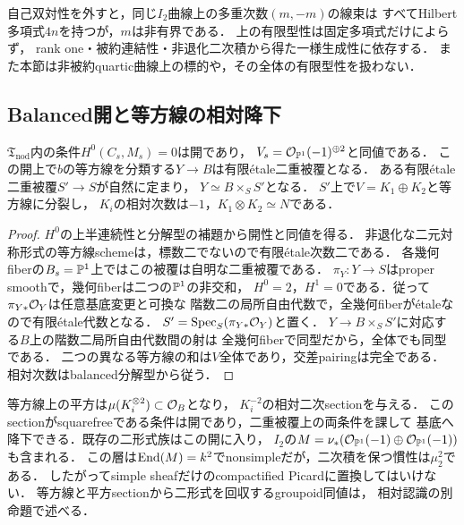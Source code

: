 \begin{remark}[固定Hilbert多項式だけでは足りない]
自己双対性を外すと，同じ$I_2$曲線上の多重次数$(m,-m)$の線束は
すべてHilbert多項式$4n$を持つが，$m$は非有界である．
上の有限型性は固定多項式だけによらず，
rank one・被約連結性・非退化二次積から得た一様生成性に依存する．
また本節は非被約quartic曲線上の標的や，その全体の有限型性を扱わない．
\end{remark}

\subsection{Balanced開と等方線の相対降下}

\begin{lemma}[balanced開と基底上の等方線二重被覆]
\label{lem:qa-tf-balanced-isotropic-descent}
$\mathfrak T_{\mathrm{nod}}$内の条件$H^0(C_s,M_s)=0$は開であり，
$V_s=\mathcal O_{\mathbb P^1}(-1)^{\oplus2}$と同値である．
この開上で$b$の等方線を分類する$Y\to B$は有限\'etale二重被覆となる．
ある有限\'etale二重被覆$S'\to S$が自然に定まり，
$Y\simeq B\times_SS'$となる．
$S'$上で$V=K_1\oplus K_2$と等方線に分裂し，
$K_i$の相対次数は$-1$，$K_1\otimes K_2\simeq N$である．
\end{lemma}
\begin{proof}
$H^0$の上半連続性と分解型の補題から開性と同値を得る．
非退化な二元対称形式の等方線schemeは，標数二でないので有限\'etale次数二である．
各幾何fiberの$B_s=\mathbb P^1$上ではこの被覆は自明な二重被覆である．
$\pi_Y:Y\to S$はproper smoothで，幾何fiberは二つの$\mathbb P^1$の非交和，
$H^0=2$，$H^1=0$である．従って$\pi_{Y*}\mathcal O_Y$は任意基底変更と可換な
階数二の局所自由代数で，全幾何fiberが\'etaleなので有限\'etale代数となる．
$S'=\operatorname{Spec}_S(\pi_{Y*}\mathcal O_Y)$と置く．
$Y\to B\times_SS'$に対応する$B$上の階数二局所自由代数間の射は
全幾何fiberで同型だから，全体でも同型である．
二つの異なる等方線の和は$V$全体であり，交差pairingは完全である．
相対次数はbalanced分解型から従う．
\end{proof}

等方線上の平方は$\mu(K_i^{\otimes2})\subset\mathcal O_B$となり，
$K_i^{-2}$の相対二次sectionを与える．
このsectionがsquarefreeである条件は開であり，二重被覆上の両条件を課して
基底へ降下できる．既存の二形式族はこの開に入り，
$I_2$の$M=\nu_*(\mathcal O_{\mathbb P^1}(-1)\oplus\mathcal O_{\mathbb P^1}(-1))$も含まれる．
この層は$\operatorname{End}(M)=k^2$でnonsimpleだが，二次積を保つ慣性は$\mu_2^2$である．
したがってsimple sheafだけのcompactified Picardに置換してはいけない．
等方線と平方sectionから二形式を回収するgroupoid同値は，
相対認識の別命題で述べる．

